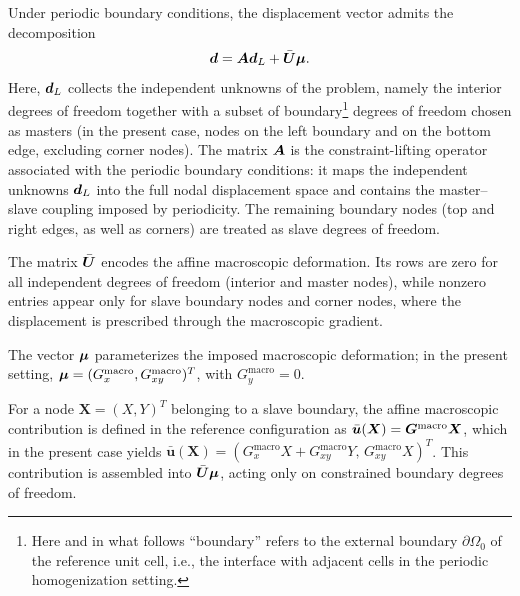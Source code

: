 \documentclass[11pt,a4paper]{article}
\begin{document}
Under periodic boundary conditions, the displacement vector admits the decomposition
\begin{equation}
\label{eq:dvecreconstruction}
 \bm{d} = \bm{A} \bm{d}_L + \bar{\bm{U}} \bm{\mu} .
\end{equation}
Here, $\bm{d}_L$ collects the independent unknowns of the problem, namely the
interior degrees of freedom together with a subset of boundary\footnote{Here and in what follows  ``boundary'' refers to the external boundary
$\partial\Omega_0$ of the reference unit cell, i.e., the interface with adjacent
cells in the periodic homogenization setting.} degrees of
freedom chosen as masters (in the present case, nodes on the left boundary and
on the bottom edge, excluding corner nodes). The matrix $\bm{A}$ is the
constraint-lifting operator associated with the periodic boundary conditions:
it maps the independent unknowns $\bm{d}_L$ into the full nodal displacement space
and contains the master--slave coupling imposed by periodicity. The remaining
boundary nodes (top and right edges, as well as corners) are treated
as slave degrees of freedom.

The matrix $\bar{\bm{U}}$ encodes the affine macroscopic deformation. Its rows are
zero for all independent degrees of freedom (interior and master nodes), while
nonzero entries appear only for slave boundary nodes and   corner
nodes, where the displacement is prescribed through the macroscopic gradient.

The vector $\bm{\mu}$ parameterizes the imposed macroscopic deformation; in the
present setting, $\bm{\mu} = (G_x^{\mathrm{macro}},
G_{xy}^{\mathrm{macro}})^T$, with $G_y^{\mathrm{macro}}=0$.

For a node $\bm{X}=(X,Y)^T$ belonging to a slave boundary, the affine macroscopic contribution is defined in the reference
configuration as $\bar{\bm{u}}(\bm{X})=\bm{G}^{\mathrm{macro}} \bm{X}$, which in the present
case yields $\bar{\bm{u}}(\bm{X})=(G_x^{\mathrm{macro}}X+G_{xy}^{\mathrm{macro}}Y,\,
G_{xy}^{\mathrm{macro}}X)^T$. This contribution is assembled into
$\bar{\bm{U}}\bm{\mu}$, acting only on constrained boundary degrees of freedom.
\end{document}
